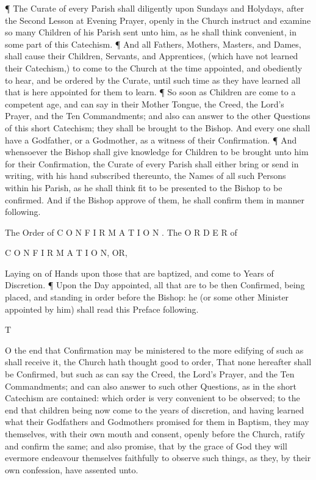¶ The Curate of every Parish shall diligently upon Sundays and Holydays, after the Second Lesson at Evening Prayer, openly in the Church instruct and examine so many Children of his Parish sent unto him, as he shall think convenient, in some part of this Catechism. ¶ And all Fathers, Mothers, Masters, and Dames, shall cause their Children, Servants, and Apprentices, (which have not learned their Catechism,) to come to the Church at the time appointed, and obediently to hear, and be ordered by the Curate, until such time as they have learned all that is here appointed for them to learn. ¶ So soon as Children are come to a competent age, and can say in their Mother Tongue, the Creed, the Lord’s Prayer, and the Ten Commandments; and also can answer to the other Questions of this short Catechism; they shall be brought to the Bishop. And every one shall have a Godfather, or a Godmother, as a witness of their Confirmation. ¶ And whensoever the Bishop shall give knowledge for Children to be brought unto him for their Confirmation, the Curate of every Parish shall either bring or send in writing, with his hand subscribed thereunto, the Names of all such Persons within his Parish, as he shall think fit to be presented to the Bishop to be confirmed. And if the Bishop approve of them, he shall confirm them in manner following.

The Order of C O N F I R M A T I O N . The O R D E R of

C O N F I R M A T I O N, OR,

Laying on of Hands upon those that are baptized, and come to Years of Discretion. ¶ Upon the Day appointed, all that are to be then Confirmed, being placed, and standing in order before the Bishop: he (or some other Minister appointed by him) shall read this Preface following.

T

O the end that Confirmation may be ministered to the more edifying of such as shall receive it, the Church hath thought good to order, That none hereafter shall be Confirmed, but such as can say the Creed, the Lord's Prayer, and the Ten Commandments; and can also answer to such other Questions, as in the short Catechism are contained: which order is very convenient to be observed; to the end that children being now come to the years of discretion, and having learned what their Godfathers and Godmothers promised for them in Baptism, they may themselves, with their own mouth and consent, openly before the Church, ratify and confirm the same; and also promise, that by the grace of God they will evermore endeavour themselves faithfully to observe such things, as they, by their own confession, have assented unto.

